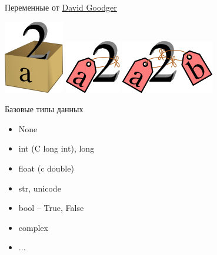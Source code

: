 \documentclass{article}
\begin{document}
\begin{center} Переменные от \href{http://python.net/~goodger/projects/pycon/2007/idiomatic/handout.html}{David Goodger}
\end{center}
\includegraphics{images/a2box.png} \hspace{3cm}
\includegraphics{images/a2tag.png} \hspace{3cm}
\includegraphics{images/ab2tag.png} \\
\newpage

\begin{center} Базовые типы данных \end{center}
\begin{itemize}
	\item None
	\item int (C long int), long
	\item float (c double)
	\item str, unicode
	\item bool – True, False
	\item complex
	\item ...
\end{itemize}
\newpage
\end{document}
